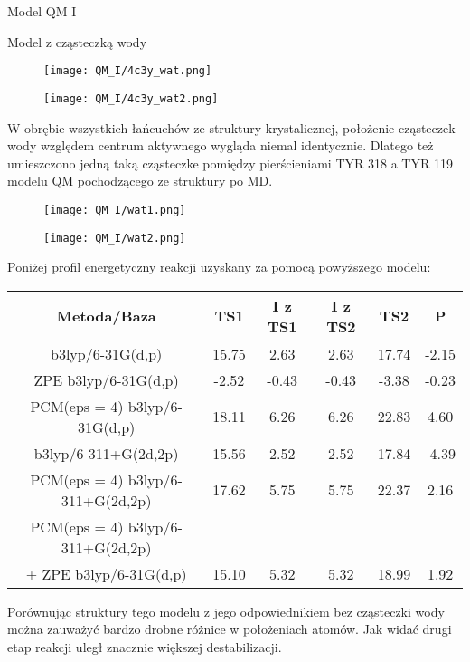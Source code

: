 \begin{section}{Model QM I}
\begin{subsection}{Model z cząsteczką wody}
   \begin{figure}[H]
  \texttt{[image: QM\_I/4c3y\_wat.png]}
\end{figure}

 \begin{figure}[H]
  \texttt{[image: QM\_I/4c3y\_wat2.png]}
\end{figure}
  
  W obrębie wszystkich łańcuchów ze struktury krystalicznej, położenie cząsteczek wody względem centrum aktywnego wygląda niemal
  identycznie. Dlatego też umieszczono jedną taką cząsteczke pomiędzy pierścieniami TYR 318 a TYR 119 modelu QM pochodzącego 
  ze struktury po MD.
  
     \begin{figure}[H]
  \texttt{[image: QM\_I/wat1.png]}
\end{figure}

 \begin{figure}[H]
  \texttt{[image: QM\_I/wat2.png]}
\end{figure}
  
  Poniżej profil energetyczny reakcji uzyskany za pomocą powyższego modelu:
  
    \begin{tabular}{||c c c c c c||} 
 \hline
 Metoda/Baza & TS1 & I z TS1 & I z TS2 & TS2 & P \\ [0.5ex] 
 \hline\hline
b3lyp/6-31G(d,p) & 15.75 &  2.63 & 2.63 & 17.74 & -2.15 \\
ZPE b3lyp/6-31G(d,p) & -2.52  & -0.43 &  -0.43  & -3.38 & -0.23 \\
PCM(eps = 4) b3lyp/6-31G(d,p) & 18.11  & 6.26 & 6.26 & 22.83 & 4.60 \\
b3lyp/6-311+G(2d,2p) & 15.56  & 2.52  & 2.52 & 17.84 & -4.39 \\
PCM(eps = 4) b3lyp/6-311+G(2d,2p) & 17.62  & 5.75 & 5.75  & 22.37 & 2.16 \\
PCM(eps = 4) b3lyp/6-311+G(2d,2p) & & & & & \\ 
+ ZPE b3lyp/6-31G(d,p)  & 15.10  & 5.32  & 5.32 & 18.99 & 1.92 \\
 \hline
 
\end{tabular}

Porównując struktury tego modelu z jego odpowiednikiem bez cząsteczki wody można zauważyć bardzo drobne różnice w położeniach
atomów. Jak widać drugi etap reakcji uległ znacznie większej destabilizacji. 


\end{subsection}
\end{section}
